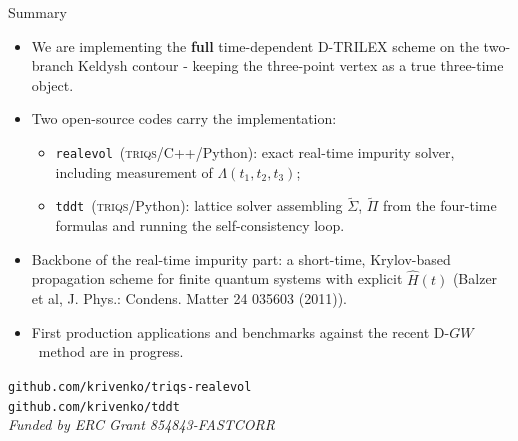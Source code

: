 \documentclass[10pt,aspectratio=169]{beamer}
\newcommand{\dgw}{D\nobreakdash-$GW$}
\newcommand{\realevol}{\texttt{realevol}}
\newcommand{\tddt}{\texttt{tddt}}
\newcommand{\triqs}{\textsc{triqs}}
\begin{document}
\begin{frame}{Summary}
    \begin{itemize}
        \item We are implementing the \textbf{full} time-dependent D-TRILEX
        scheme on the two-branch Keldysh contour - keeping the
        three-point vertex as a true three-time object.
        \item Two open-source codes carry the implementation:
        \begin{itemize}
            \item \realevol\ (\triqs/C++/Python): exact real-time impurity solver,
            including measurement of $\Lambda(t_1,t_2,t_3)$;
            \item \tddt\ (\triqs/Python): lattice solver assembling
            $\tilde\Sigma$, $\tilde\Pi$ from the four-time formulas
            and running the self-consistency loop.
        \end{itemize}
        \item Backbone of the real-time impurity part: a short-time,
        Krylov-based propagation scheme for finite quantum systems
        with explicit $\hat H(t)$ (Balzer et al, J. Phys.: Condens. Matter 24 035603 (2011)).
        \item First production applications and benchmarks against the
        recent \dgw\ method are in progress.
    \end{itemize}

    \vspace{1em}
    \begin{center}\small
        \texttt{github.com/krivenko/triqs-realevol}\\
        \texttt{github.com/krivenko/tddt}\\[2pt]
        \emph{Funded by ERC Grant 854843-FASTCORR}
    \end{center}
\end{frame}
\end{document}
